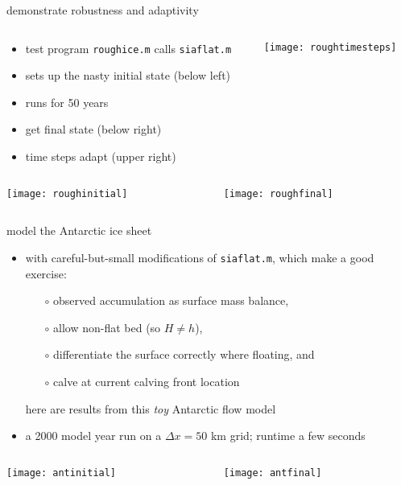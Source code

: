 \begin{frame}{demonstrate robustness and adaptivity}

\begin{columns}
\begin{column}{0.6\textwidth}
\small
\begin{itemize}
\item test program \texttt{roughice.m} calls \texttt{siaflat.m}
\item sets up the nasty initial state (below left)
\item runs for 50 years
\item get final state (below right)
\item time steps adapt (upper right)
\end{itemize}
\end{column}
\begin{column}{0.4\textwidth}
\texttt{[image: roughtimesteps]}
\end{column}
\end{columns}

\bigskip
\begin{columns}
\begin{column}{0.5\textwidth}
\texttt{[image: roughinitial]}
\end{column}
\begin{column}{0.5\textwidth}
\texttt{[image: roughfinal]}
\end{column}
\end{columns}
\end{frame}


\begin{frame}{model the Antarctic ice sheet}

\normalsize
\begin{itemize}
\item with careful-but-small modifications of \texttt{siaflat.m}, which make a good exercise:
  \begin{itemize}
  \item[$\circ$] observed accumulation as surface mass balance,
  \item[$\circ$] allow non-flat bed (so $H\ne h$),
  \item[$\circ$] differentiate the surface correctly where floating, and
  \item[$\circ$] calve at current calving front location
  \end{itemize}
here are results from this \emph{toy} Antarctic flow model
\item a 2000 model year run on a $\Delta x=50$ km grid; runtime a few seconds
\end{itemize}

\bigskip

\begin{columns}
\begin{column}{0.4\textwidth}
\texttt{[image: antinitial]}
\end{column}
\begin{column}{0.55\textwidth}
\texttt{[image: antfinal]}
\end{column}
\end{columns}
\end{frame}



